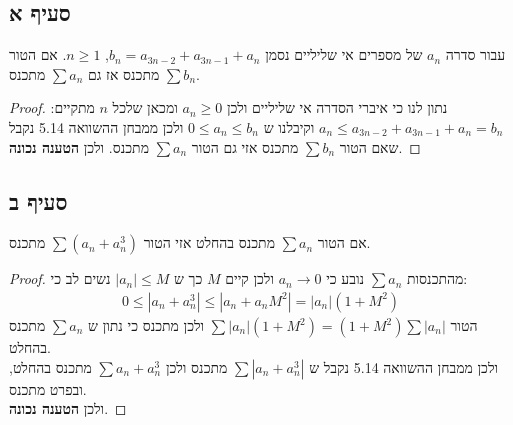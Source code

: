 \documentclass{article}
\begin{document}
		\subsection*{סעיף א}
		עבור סדרה $a_n$ של מספרים אי שליליים נסמן $b_n = a_{3n - 2} + a_{3n - 1} + a_n$, $n \geq 1$.
		אם הטור $\sum b_n$ מתכנס אז גם $\sum a_n$ מתכנס.
		\begin{proof}
			נתון לנו כי איברי הסדרה אי שליליים ולכן $a_n \geq 0$
			ומכאן שלכל $n$ מתקיים:
			$a_n \leq a_{3n - 2} + a_{3n - 1} + a_n = b_n$
			וקיבלנו ש $0 \leq a_n \leq b_n$ ולכן ממבחן ההשוואה 5.14 נקבל שאם הטור $\sum b_n$ מתכנס אזי גם הטור $\sum a_n$ מתכנס.
			ולכן \textbf{הטענה נכונה}.
		\end{proof}

		\subsection*{סעיף ב}
		אם הטור $\sum a_n$ מתכנס בהחלט אזי הטור $\sum (a_n + a_n^3)$ מתכנס.
		\begin{proof}
			מהתכנסות $\sum a_n$ נובע כי $a_n \to 0$ ולכן קיים $M$ כך ש $|a_n| \leq M$
			נשים לב כי:
			\begin{align*}
				0 \leq |a_n + a_n^3| \leq |a_n + a_n M^2| = |a_n|(1 + M^2)
			\end{align*}
			הטור $\sum |a_n|(1 + M^2) = (1 + M^2) \sum |a_n|$ ולכן מתכנס כי נתון ש $\sum a_n$ מתכנס בהחלט. \\
			ולכן ממבחן ההשוואה 5.14 נקבל ש $\sum |a_n + a_n^3|$ מתכנס ולכן $\sum a_n + a_n^3$ מתכנס בהחלט, ובפרט מתכנס. \\
			ולכן \textbf{הטענה נכונה}.
		\end{proof}
\end{document}
